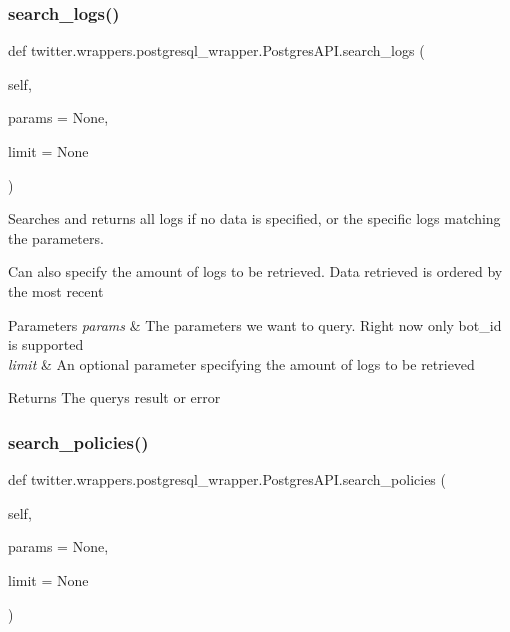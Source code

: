 \subsubsection{\texorpdfstring{search\+\_\+logs()}{search\_logs()}}
{\footnotesize\ttfamily def twitter.\+wrappers.\+postgresql\+\_\+wrapper.\+Postgres\+A\+P\+I.\+search\+\_\+logs (\begin{DoxyParamCaption}\item[{}]{self,  }\item[{}]{params = {\ttfamily None},  }\item[{}]{limit = {\ttfamily None} }\end{DoxyParamCaption})}



Searches and returns all logs if no data is specified, or the specific logs matching the parameters. 

Can also specify the amount of logs to be retrieved. Data retrieved is ordered by the most recent


\begin{DoxyParams}{Parameters}
{\em params} & The parameters we want to query. Right now only bot\+\_\+id is supported \\
\hline
{\em limit} & An optional parameter specifying the amount of logs to be retrieved\\
\hline
\end{DoxyParams}
\begin{DoxyReturn}{Returns}
The query\textquotesingle{}s result or error 
\end{DoxyReturn}
\mbox{\label{classtwitter_1_1wrappers_1_1postgresql__wrapper_1_1PostgresAPI_aeac23865a14e4f32e90cb7daa4a03e2b}} 
\subsubsection{\texorpdfstring{search\+\_\+policies()}{search\_policies()}}
{\footnotesize\ttfamily def twitter.\+wrappers.\+postgresql\+\_\+wrapper.\+Postgres\+A\+P\+I.\+search\+\_\+policies (\begin{DoxyParamCaption}\item[{}]{self,  }\item[{}]{params = {\ttfamily None},  }\item[{}]{limit = {\ttfamily None} }\end{DoxyParamCaption})}



